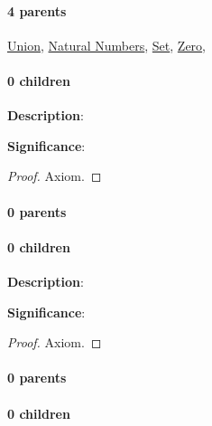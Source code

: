 \documentclass[../main.tex]{subfiles}
\begin{document}
\paragraph{4 parents} \hyperref[statement:Union]{Union}, \hyperref[statement:Natural Numbers]{Natural Numbers}, \hyperref[statement:Set]{Set}, \hyperref[statement:Zero]{Zero}, 
\paragraph{0 children} 




\begin{statement}
\label{statement:Additive Inverse}\hspace*{0pt}\par
\end{statement}
\textbf{Description}:{\color{red} \todo}\par
{\color{magenta} \textbf{Significance}:{\color{red} \todo}\par}
\begin{proof}Axiom.\end{proof}\par
\paragraph{0 parents} 
\paragraph{0 children} 




\begin{statement}
\label{statement:Integers}\hspace*{0pt}\par
\end{statement}
\textbf{Description}:{\color{red} \todo}\par
{\color{magenta} \textbf{Significance}:{\color{red} \todo}\par}
\begin{proof}Axiom.\end{proof}\par
\paragraph{0 parents} 
\paragraph{0 children} 
\end{document}
